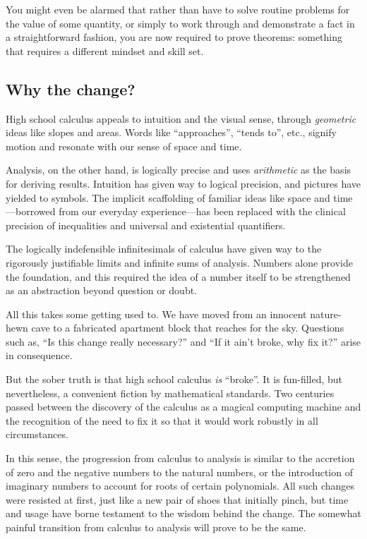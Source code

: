 \documentclass[
  a4paper,
]{article}
\begin{document}
You might even be alarmed that rather than have to solve routine
problems for the value of some quantity, or simply to work through and
demonstrate a fact in a straightforward fashion, you are now required to
prove theorems: something that requires a different mindset and skill
set.

\subsection{Why the change?}\label{why-the-change}

High school calculus appeals to intuition and the visual sense, through
\emph{geometric} ideas like slopes and areas. Words like ``approaches'',
``tends to'', etc., signify motion and resonate with our sense of space
and time.

Analysis, on the other hand, is logically precise and uses
\emph{arithmetic} as the basis for deriving results. Intuition has given
way to logical precision, and pictures have yielded to symbols. The
implicit scaffolding of familiar ideas like space and time---borrowed
from our everyday experience---has been replaced with the clinical
precision of inequalities and universal and existential quantifiers.

The logically indefensible infinitesimals of calculus have given way to
the rigorously justifiable limits and infinite sums of analysis. Numbers
alone provide the foundation, and this required the idea of a number
itself to be strengthened as an abstraction beyond question or doubt.

All this takes some getting used to. We have moved from an innocent
nature-hewn cave to a fabricated apartment block that reaches for the
sky. Questions such as, ``Is this change really necessary?'' and ``If it
ain't broke, why fix it?'' arise in consequence.

But the sober truth is that high school calculus \emph{is} ``broke''. It
is fun-filled, but nevertheless, a convenient fiction by mathematical
standards. Two centuries passed between the discovery of the calculus as
a magical computing machine and the recognition of the need to fix it so
that it would work robustly in all circumstances.

In this sense, the progression from calculus to analysis is similar to
the accretion of zero and the negative numbers to the natural numbers,
or the introduction of imaginary numbers to account for roots of certain
polynomials. All such changes were resisted at first, just like a new
pair of shoes that initially pinch, but time and usage have borne
testament to the wisdom behind the change. The somewhat painful
transition from calculus to analysis will prove to be the same.
\end{document}
